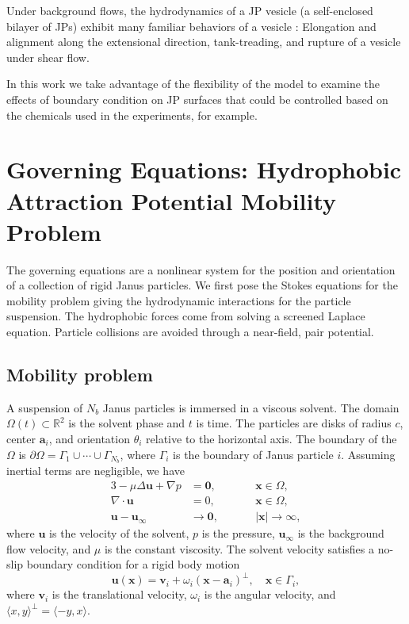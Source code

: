 \documentclass[aps,prl,preprint,groupedaddress]{revtex4-2}
\renewcommand{\aa}{\mathbf{a}}
\newcommand{\bd}{\partial}
\newcommand{\xx}{\mathbf{x}}
\newcommand{\uu}{\mathbf{u}}
\renewcommand{\vv}{\mathbf{v}}
\begin{document}
Under background flows, the hydrodynamics of a JP vesicle (a
self-enclosed bilayer of JPs) exhibit many familiar behaviors of a
vesicle \cite{Fu2022_JFM}: 
Elongation and alignment along the extensional direction, tank-treading, and rupture of a vesicle under shear flow.

In this work we take advantage of the flexibility of the model to examine the effects of boundary condition on JP surfaces that could be controlled based on the chemicals used in the experiments, for example.

\section{Governing Equations: Hydrophobic Attraction Potential Mobility Problem} 
The governing equations are a nonlinear system
for the position and orientation of a collection of
rigid Janus particles.
We first pose the Stokes equations
for the mobility problem giving the hydrodynamic interactions
for the particle suspension.  
The hydrophobic forces come from solving a screened Laplace equation.
Particle collisions are avoided through a near-field, pair
potential.

\subsection{Mobility problem}
A suspension of $N_b$ Janus particles is immersed in a viscous solvent.
The domain $\Omega(t) \subset \mathbb{R}^2$ is the solvent phase
and $t$ is time.
The particles are disks of radius $c$, center $\aa_i$, and
orientation $\theta_i$ relative to the horizontal axis.  
The boundary of the $\Omega$ is $\bd\Omega = \Gamma_1 \cup
\cdots \cup \Gamma_{N_b}$, where $\Gamma_i$ is the boundary of Janus
particle $i$. Assuming inertial terms are
negligible, we have 
\begin{alignat}{3}
\label{eq:stokes}
  -\mu \Delta \uu + \nabla p &= \mathbf{0},     && \xx \in \Omega, \\
  \nabla\cdot \uu &= 0, \qquad && \xx \in \Omega, \\
  \uu - \uu_\infty &\to \mathbf{0}, && |\xx| \to \infty,
\end{alignat}
where $\uu$ is the velocity of the solvent,
$p$ is the pressure, $\uu_\infty$ is the
background flow velocity, and $\mu$ is the constant viscosity.
The solvent velocity satisfies a no-slip boundary
condition for a rigid body motion
\begin{equation}
  \label{eq:rigid-vel}
  \uu(\xx) = \vv_i + \omega_i (\xx - \aa_i)^\perp, 
    \quad \xx \in \Gamma_i,
\end{equation}
where $\vv_i$ is the translational velocity, $\omega_i$ is the
angular velocity, and
$\langle x, y \rangle^{\perp} = \langle -y, x\rangle$.
\end{document}
